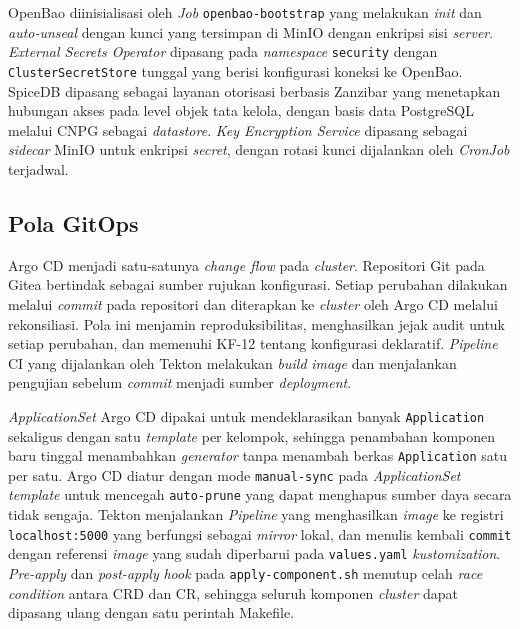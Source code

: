 OpenBao diinisialisasi oleh \textit{Job} \texttt{openbao-bootstrap} yang melakukan \textit{init} dan \textit{auto-unseal} dengan kunci yang tersimpan di MinIO \autocite{minio2024} dengan enkripsi sisi \textit{server}. \textit{External Secrets Operator} dipasang pada \textit{namespace} \texttt{security} dengan \texttt{ClusterSecretStore} tunggal yang berisi konfigurasi koneksi ke OpenBao. SpiceDB \autocite{spicedb2025} dipasang sebagai layanan otorisasi berbasis Zanzibar yang menetapkan hubungan akses pada level objek tata kelola, dengan basis data PostgreSQL melalui CNPG sebagai \textit{datastore}. \textit{Key Encryption Service} dipasang sebagai \textit{sidecar} MinIO untuk enkripsi \textit{secret}, dengan rotasi kunci dijalankan oleh \textit{CronJob} terjadwal.

\subsection{Pola GitOps}
\label{subsec:gitops}

Argo CD \autocite{argocd2024} menjadi satu-satunya \textit{change flow} pada \textit{cluster}. Repositori Git pada Gitea \autocite{gitea2025} bertindak sebagai sumber rujukan konfigurasi. Setiap perubahan dilakukan melalui \textit{commit} pada repositori dan diterapkan ke \textit{cluster} oleh Argo CD melalui rekonsiliasi. Pola ini menjamin reproduksibilitas, menghasilkan jejak audit untuk setiap perubahan, dan memenuhi KF-12 tentang konfigurasi deklaratif. \textit{Pipeline} CI yang dijalankan oleh Tekton \autocite{tekton2024} melakukan \textit{build} \textit{image} dan menjalankan pengujian sebelum \textit{commit} menjadi sumber \textit{deployment}.

\textit{ApplicationSet} Argo CD dipakai untuk mendeklarasikan banyak \texttt{Application} sekaligus dengan satu \textit{template} per kelompok, sehingga penambahan komponen baru tinggal menambahkan \textit{generator} tanpa menambah berkas \texttt{Application} satu per satu. Argo CD diatur dengan mode \texttt{manual-sync} pada \textit{ApplicationSet} \textit{template} untuk mencegah \texttt{auto-prune} yang dapat menghapus sumber daya secara tidak sengaja. Tekton menjalankan \textit{Pipeline} yang menghasilkan \textit{image} ke registri \texttt{localhost:5000} yang berfungsi sebagai \textit{mirror} lokal, dan menulis kembali \texttt{commit} dengan referensi \textit{image} yang sudah diperbarui pada \texttt{values.yaml} \textit{kustomization}. \textit{Pre-apply} dan \textit{post-apply} \textit{hook} pada \texttt{apply-component.sh} menutup celah \textit{race condition} antara CRD dan CR, sehingga seluruh komponen \textit{cluster} dapat dipasang ulang dengan satu perintah Makefile.

